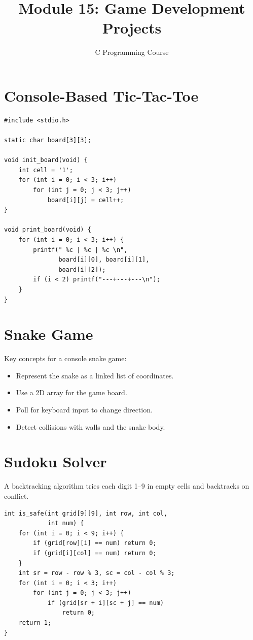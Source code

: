 \documentclass[11pt,a4paper]{article}
\title{Module 15: Game Development Projects}
\author{C Programming Course}
\date{}
\begin{document}
\maketitle
\thispagestyle{fancy}

\section{Console-Based Tic-Tac-Toe}
\begin{lstlisting}
#include <stdio.h>

static char board[3][3];

void init_board(void) {
    int cell = '1';
    for (int i = 0; i < 3; i++)
        for (int j = 0; j < 3; j++)
            board[i][j] = cell++;
}

void print_board(void) {
    for (int i = 0; i < 3; i++) {
        printf(" %c | %c | %c \n",
               board[i][0], board[i][1],
               board[i][2]);
        if (i < 2) printf("---+---+---\n");
    }
}
\end{lstlisting}

\section{Snake Game}
Key concepts for a console snake game:
\begin{itemize}
  \item Represent the snake as a linked list of coordinates.
  \item Use a 2D array for the game board.
  \item Poll for keyboard input to change direction.
  \item Detect collisions with walls and the snake body.
\end{itemize}

\section{Sudoku Solver}
A backtracking algorithm tries each digit 1--9 in empty cells and backtracks on
conflict.

\begin{lstlisting}
int is_safe(int grid[9][9], int row, int col,
            int num) {
    for (int i = 0; i < 9; i++) {
        if (grid[row][i] == num) return 0;
        if (grid[i][col] == num) return 0;
    }
    int sr = row - row % 3, sc = col - col % 3;
    for (int i = 0; i < 3; i++)
        for (int j = 0; j < 3; j++)
            if (grid[sr + i][sc + j] == num)
                return 0;
    return 1;
}
\end{lstlisting}
\end{document}
